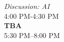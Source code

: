 \begin{calendar}{\textwidth}
{\textit{Discussion: AI}  \\\vspace{0.1cm}4:00 PM-4:30 PM \\\daysep
\textbf{TBA} \\\vspace{0.1cm} 5:30 PM--8:00 PM \\\daysep
}




\end{calendar}
